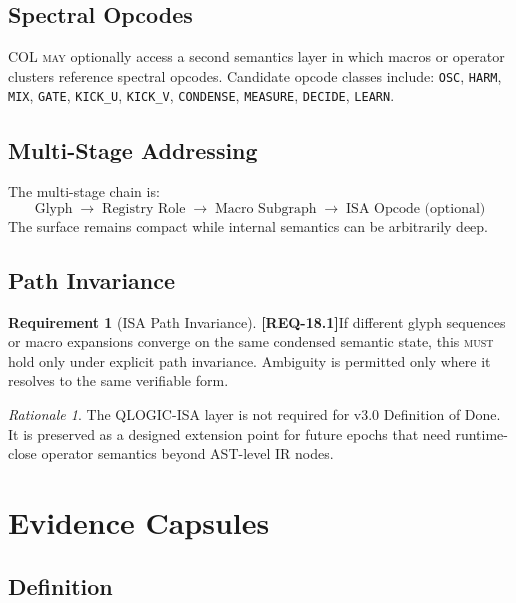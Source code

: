 \documentclass[11pt,a4paper,twoside]{article}
\theoremstyle{definition}
\newtheorem{requirement}{Requirement}[section]
\theoremstyle{remark}
\newtheorem{rationale}{Rationale}[section]
\newcommand{\req}[1]{\textbf{\textcolor{reqred}{[REQ-#1]}}}
\newcommand{\must}{\textsc{must}}
\newcommand{\may}{\textsc{may}}
\begin{document}
\subsection{Spectral Opcodes}

COL \may{} optionally access a second semantics layer in which macros or operator clusters reference spectral opcodes. Candidate opcode classes include: \texttt{OSC}, \texttt{HARM}, \texttt{MIX}, \texttt{GATE}, \texttt{KICK\_U}, \texttt{KICK\_V}, \texttt{CONDENSE}, \texttt{MEASURE}, \texttt{DECIDE}, \texttt{LEARN}.

\subsection{Multi-Stage Addressing}

The multi-stage chain is:
\[
  \text{Glyph} \;\to\; \text{Registry Role} \;\to\; \text{Macro Subgraph} \;\to\; \text{ISA Opcode (optional)}
\]
The surface remains compact while internal semantics can be arbitrarily deep.

\subsection{Path Invariance}

\begin{requirement}[ISA Path Invariance]
\label{req:isa-path-inv}
\req{18.1}\quad If different glyph sequences or macro expansions converge on the same condensed semantic state, this \must{} hold only under explicit path invariance. Ambiguity is permitted only where it resolves to the same verifiable form.
\end{requirement}

\begin{rationale}
The QLOGIC-ISA layer is not required for v3.0 Definition of Done. It is preserved as a designed extension point for future epochs that need runtime-close operator semantics beyond AST-level IR nodes.
\end{rationale}



\section{Evidence Capsules}
\label{sec:capsules}

\subsection{Definition}
\end{document}
